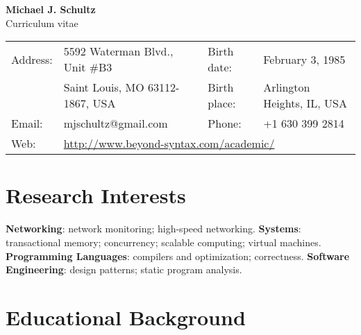 \documentclass[12pt]{article}
\begin{document}
\thispagestyle{plain}
\begin{center}
	{\Large {\bf Michael J. Schultz}} \\
	Curriculum vitae
\end{center}

\noindent\begin{tabular*}{\textwidth}{@{\extracolsep{\fill}}llll}
	Address:     & 5592 Waterman Blvd., Unit \#B3
	                   & Birth date:  & February 3, 1985    \\
	             & Saint Louis, MO 63112-1867, USA
	                   & Birth place: & Arlington Heights, IL, USA \\
	Email: & mjschultz@gmail.com
	                   & Phone: & +1 630 399 2814                        \\
    Web: &
    \multicolumn{3}{l}{\url{http://www.beyond-syntax.com/academic/}} \\
\end{tabular*}

\section*{Research Interests}

{\bf Networking}: network monitoring; high-speed networking.
{\bf Systems}: transactional memory; concurrency; scalable computing; virtual
machines.
{\bf Programming Languages}: compilers and optimization; correctness.
{\bf Software Engineering}: design patterns; static program analysis.

\section*{Educational Background}
\end{document}
